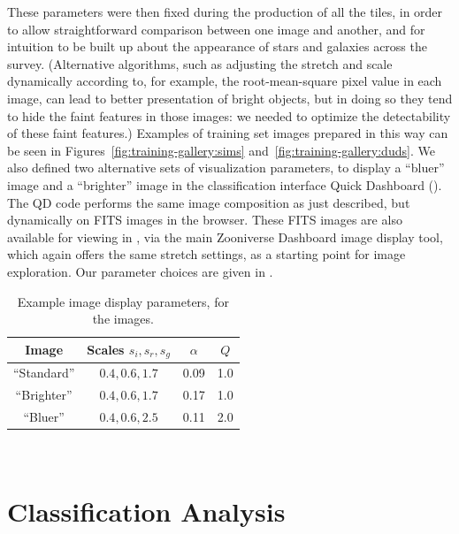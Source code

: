 \documentclass[useAMS,usenatbib,a4paper]{mn2e}
\begin{document}
These parameters were then fixed during the production of all the tiles, in
order to allow straightforward comparison between one image and another, and
for intuition to be built up about the appearance of stars and galaxies across
the survey. (Alternative algorithms, such as adjusting the stretch and scale
dynamically according to, for example, the root-mean-square pixel value in
each image, can lead to better presentation of bright objects, but in doing so
they tend to hide the faint features in those images: we needed to optimize
the detectability of these faint features.)   Examples of \cfhtls training set
images prepared in this way can be seen in Figures~\ref{fig:training-gallery:sims}
and~\ref{fig:training-gallery:duds}. We also defined two alternative sets of
visualization parameters, to display a ``bluer'' image and a ``brighter''
image in the classification interface Quick Dashboard
(). The QD code performs the same image composition
as just described, but dynamically on FITS images in the browser. These FITS
images are also available for viewing in \Talk, via the main Zooniverse
Dashboard image display tool, which again offers the same stretch settings, as
a starting point for image exploration. Our parameter choices are given in
.

\begin{table}
\begin{center}
\caption{Example \humvi image display parameters, for the \cfhtls images.}
\label{tab:data:humvi}
\begin{tabular}{cccc}
  \hline
  \hline {Image} & Scales ${s_i,s_r,s_g}$ & $\alpha$ & $Q$ \\
  \hline
    ``Standard'' &    ${0.4,0.6,1.7}$     &   0.09   & 1.0 \\
    ``Brighter'' &    ${0.4,0.6,1.7}$     &   0.17   & 1.0 \\
       ``Bluer'' &    ${0.4,0.6,2.5}$     &   0.11   & 2.0 \\
  \hline \hline
\end{tabular}
\medskip\\
\end{center}
\end{table}


\section{Classification Analysis}
\label{sec:swap}
\end{document}
